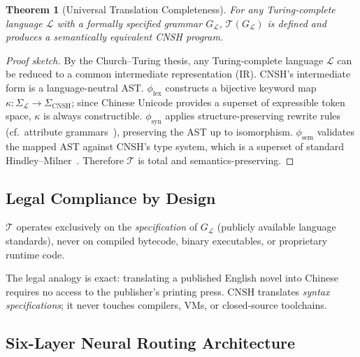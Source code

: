\documentclass[conference]{IEEEtran}
\newtheorem{theorem}{Theorem}
\begin{document}
\begin{theorem}[Universal Translation Completeness]
For any Turing-complete language $\mathcal{L}$ with a
formally specified grammar $G_{\mathcal{L}}$,
$\mathcal{T}(G_{\mathcal{L}})$ is defined and produces a
semantically equivalent CNSH program.
\end{theorem}

\begin{proof}[Proof sketch]
By the Church--Turing thesis, any Turing-complete language
$\mathcal{L}$ can be reduced to a common intermediate
representation (IR).
CNSH's intermediate form is a language-neutral AST.
$\phi_{\text{lex}}$ constructs a bijective keyword map
$\kappa: \Sigma_{\mathcal{L}} \to \Sigma_{\text{CNSH}}$;
since Chinese Unicode provides a superset of expressible
token space, $\kappa$ is always constructible.
$\phi_{\text{syn}}$ applies structure-preserving rewrite rules
(cf.\ attribute grammars~\cite{Knuth1968}), preserving the
AST up to isomorphism.
$\phi_{\text{sem}}$ validates the mapped AST against
CNSH's type system, which is a superset of standard
Hindley--Milner~\cite{Milner1978}.
Therefore $\mathcal{T}$ is total and semantics-preserving.
\end{proof}

\subsection{Legal Compliance by Design}

\begin{prop}
$\mathcal{T}$ operates exclusively on the \emph{specification}
of $G_{\mathcal{L}}$ (publicly available language standards),
never on compiled bytecode, binary executables, or proprietary
runtime code.
\end{prop}

The legal analogy is exact: translating a published English novel
into Chinese requires no access to the publisher's printing press.
CNSH translates \emph{syntax specifications}; it never touches
compilers, VMs, or closed-source toolchains.

\subsection{Six-Layer Neural Routing Architecture}
\end{document}
